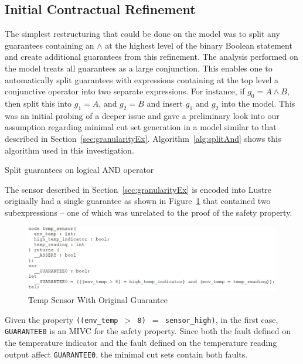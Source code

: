 \subsection{Initial Contractual Refinement}
\label{sec:granularityANDAlg}
The simplest restructuring that could be done on the model was to split any guarantees containing an $\land$ at the highest level of the binary Boolean statement and create additional guarantees from this refinement. The analysis performed on the model treats all guarantees as a large conjunction. This enables one to automatically split guarantees with expressions containing at the top level a conjunctive operator into two separate expressions. For instance, if $g_0 = A \land B$, then split this into $g_1 = A$, and $g_2 = B$ and insert $g_1$ and $g_2$ into the model. This was an initial probing of a deeper issue and gave a preliminary look into our assumption regarding minimal cut set generation in a model similar to that described in Section~\ref{sec:granularityEx}. Algorithm~\ref{alg:splitAnd} shows this algorithm used in this investigation. 

\begin{algorithm}[h]

	\caption{Split guarantees on logical AND operator}
	\label{alg:splitAnd}
\end{algorithm}

The sensor described in Section~\ref{sec:granularityEx} is encoded into Lustre originally had a single guarantee as shown in Figure~\ref{fig:lustreOneGuar} that contained two subexpressions -- one of which was unrelated to the proof of the safety property.
\begin{figure}[h!]
\begin{center}
\includegraphics[width=1.0\textwidth]{images/lustreTwoGuar.PNG}
\caption{Temp Sensor With Original Guarantee} \label{fig:lustreOneGuar}
\end{center}
\end{figure} 
Given the property \texttt{((env\_temp $>$ 8) $=$ sensor\_high)}, in the first case, \texttt{GUARANTEE0} is an MIVC for the safety property. Since both the fault defined on the temperature indicator and the fault defined on the temperature reading output affect \texttt{GUARANTEE0}, the minimal cut sets contain both faults. 

